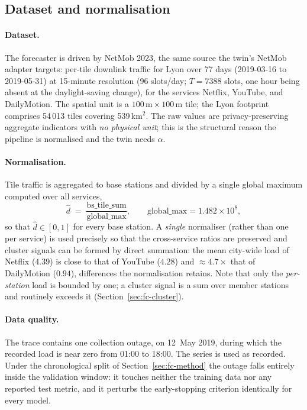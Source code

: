\subsection{Dataset and normalisation}

\paragraph{Dataset.} The forecaster is driven by NetMob 2023, the same source the twin's
NetMob adapter targets: per-tile downlink traffic for Lyon over 77 days
(2019-03-16 to 2019-05-31) at 15-minute resolution (96 slots/day; $T=7388$ slots, one hour being absent at the daylight-saving change), for the services
Netflix, YouTube, and DailyMotion. The spatial unit is a $100\,\mathrm{m}\times100\,\mathrm{m}$ tile; the
Lyon footprint comprises 54\,013 tiles covering 539\,km$^2$. The raw values are privacy-preserving
aggregate indicators with \emph{no physical unit}; this is the structural reason the pipeline is
normalised and the twin needs $\alpha$.

\paragraph{Normalisation.} Tile traffic is aggregated to base stations and divided by a single
global maximum computed over all services,
\begin{equation}
  \hat{d} \;=\; \frac{\text{bs\_tile\_sum}}{\text{global\_max}},
  \qquad \text{global\_max} = 1.482\times10^{8},
\end{equation}
so that $\hat{d}\in[0,1]$ for every base station. A \emph{single} normaliser (rather than one per
service) is used precisely so that the cross-service ratios are preserved and cluster signals can be
formed by direct summation: the mean city-wide load of Netflix ($4.39$) is close to that of YouTube
($4.28$) and $\approx 4.7\times$ that of DailyMotion ($0.94$), differences the normalisation retains.
Note that only the \emph{per-station} load is bounded by one; a cluster signal is a sum over member
stations and routinely exceeds it (Section~\ref{sec:fc-cluster}).

\paragraph{Data quality.} The trace contains one collection outage, on 12~May 2019, during which
the recorded load is near zero from 01:00 to 18:00. The series is used as recorded. Under the
chronological split of Section~\ref{sec:fc-method} the outage falls entirely inside the validation
window: it touches neither the training data nor any reported test metric, and it perturbs the
early-stopping criterion identically for every model.


